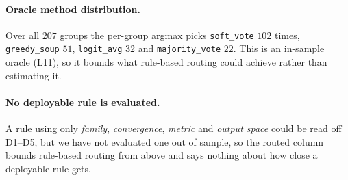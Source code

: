 \documentclass[11pt]{article}
\begin{document}
\paragraph{Oracle method distribution.} Over all $207$ groups the per-group argmax picks \texttt{soft\_vote} $102$ times, \texttt{greedy\_soup} $51$, \texttt{logit\_avg} $32$ and \texttt{majority\_vote} $22$. This is an in-sample oracle (L11), so it bounds what rule-based routing could achieve rather than estimating it.

\paragraph{No deployable rule is evaluated.} A rule using only \emph{family}, \emph{convergence}, \emph{metric} and \emph{output space} could be read off D1--D5, but we have not evaluated one out of sample, so the routed column bounds rule-based routing from above and says nothing about how close a deployable rule gets.
\end{document}
